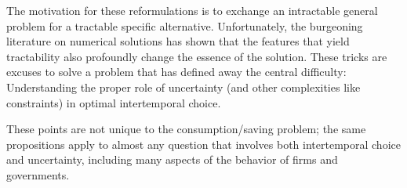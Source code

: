 \documentclass[titlepage, headings=optiontotocandhead]{\econtex}
\begin{document}
The motivation for these reformulations is to exchange an intractable general problem
for a tractable specific alternative.  Unfortunately, the burgeoning
literature on numerical solutions has shown that the features that
yield tractability also profoundly change the essence of the solution.  These tricks
are excuses to solve a problem that has defined away the central
difficulty: Understanding the proper role of uncertainty (and other
complexities like constraints) in optimal intertemporal choice.


These points are not unique to the consumption/saving problem; the
same propositions apply to almost any question that involves both
intertemporal choice and uncertainty, including many aspects of the
behavior of firms and governments.  

\end{document}
